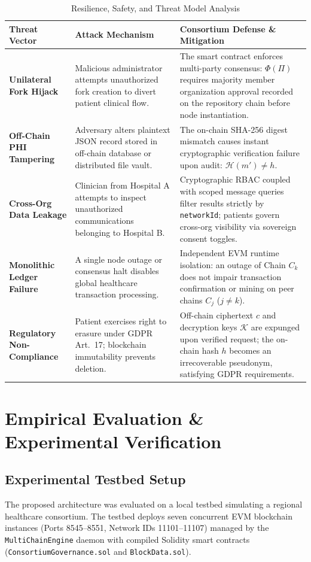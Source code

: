 \documentclass[conference]{IEEEtran}
\theoremstyle{definition}
\begin{document}
\begin{table}[t]
\centering
\caption{Resilience, Safety, and Threat Model Analysis}
\label{tab:threat}
\begin{tabular}{p{3.5cm}p{5.5cm}p{7.5cm}}
\toprule
\textbf{Threat Vector} & \textbf{Attack Mechanism} & \textbf{Consortium Defense \& Mitigation} \\
\midrule
\textbf{Unilateral Fork Hijack} & Malicious administrator attempts unauthorized fork creation to divert patient clinical flow. & The smart contract enforces multi-party consensus: $\Phi(\Pi)$ requires majority member organization approval recorded on the repository chain before node instantiation. \\
\addlinespace
\textbf{Off-Chain PHI Tampering} & Adversary alters plaintext JSON record stored in off-chain database or distributed file vault. & The on-chain SHA-256 digest mismatch causes instant cryptographic verification failure upon audit: $\mathcal{H}(m') \neq h$. \\
\addlinespace
\textbf{Cross-Org Data Leakage} & Clinician from Hospital A attempts to inspect unauthorized communications belonging to Hospital B. & Cryptographic RBAC coupled with scoped message queries filter results strictly by \texttt{networkId}; patients govern cross-org visibility via sovereign consent toggles. \\
\addlinespace
\textbf{Monolithic Ledger Failure} & A single node outage or consensus halt disables global healthcare transaction processing. & Independent EVM runtime isolation: an outage of Chain $C_k$ does not impair transaction confirmation or mining on peer chains $C_j$ ($j \neq k$). \\
\addlinespace
\textbf{Regulatory Non-Compliance} & Patient exercises right to erasure under GDPR Art.~17; blockchain immutability prevents deletion. & Off-chain ciphertext $c$ and decryption keys $\mathcal{K}$ are expunged upon verified request; the on-chain hash $h$ becomes an irrecoverable pseudonym, satisfying GDPR requirements. \\
\bottomrule
\end{tabular}
\end{table}

\section{Empirical Evaluation \& Experimental Verification}

\subsection{Experimental Testbed Setup}
The proposed architecture was evaluated on a local testbed simulating a regional healthcare consortium. The testbed deploys seven concurrent EVM blockchain instances (Ports 8545--8551, Network IDs 11101--11107) managed by the \texttt{MultiChainEngine} daemon with compiled Solidity smart contracts (\texttt{ConsortiumGovernance.sol} and \texttt{BlockData.sol}).
\end{document}
